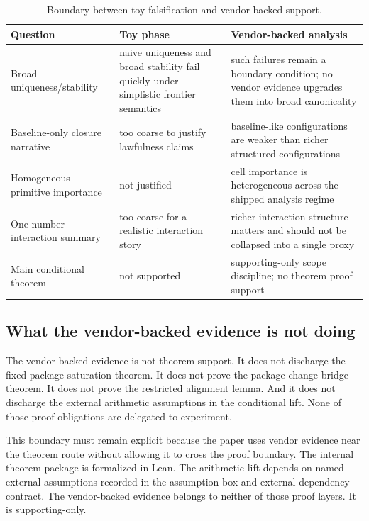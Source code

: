 \begin{table}[t]
\caption{Boundary between toy falsification and vendor-backed support.}
\label{tab:toy-vendor-boundary}
\centering
\small
\begin{tabularx}{\textwidth}{@{}l X X@{}}
\toprule
Question & Toy phase & Vendor-backed analysis \\
\midrule
Broad uniqueness/stability & naive uniqueness and broad stability fail quickly under simplistic frontier semantics & such failures remain a boundary condition; no vendor evidence upgrades them into broad canonicality \\[4pt]
Baseline-only closure narrative & too coarse to justify lawfulness claims & baseline-like configurations are weaker than richer structured configurations \\[4pt]
Homogeneous primitive importance & not justified & cell importance is heterogeneous across the shipped analysis regime \\[4pt]
One-number interaction summary & too coarse for a realistic interaction story & richer interaction structure matters and should not be collapsed into a single proxy \\[4pt]
Main conditional theorem & not supported & supporting-only scope discipline; no theorem proof support \\
\bottomrule
\end{tabularx}
\end{table}

\subsection*{What the vendor-backed evidence is not doing}

The vendor-backed evidence is not theorem support. It does not discharge the
fixed-package saturation theorem. It does not prove the package-change bridge
theorem. It does not prove the restricted alignment lemma. And it does not
discharge the external arithmetic assumptions in the conditional lift. None of
those proof obligations are delegated to experiment.

This boundary must remain explicit because the paper uses vendor evidence near
the theorem route without allowing it to cross the proof boundary. The internal
theorem package is formalized in Lean. The arithmetic lift depends on named
external assumptions recorded in the assumption box and external dependency
contract. The vendor-backed evidence belongs to neither of those proof layers.
It is supporting-only.

